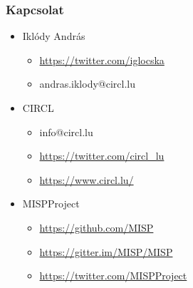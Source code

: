 \begin{frame}
  \frametitle{Kapcsolat}
  \begin{itemize}
    \item Iklódy András
    \begin{itemize}
      \item \url{https://twitter.com/iglocska}
      \item andras.iklody@circl.lu
    \end{itemize}
    \item CIRCL
    \begin{itemize}
      \item info@circl.lu
      \item \url{https://twitter.com/circl_lu}
      \item \url{https://www.circl.lu/}
    \end{itemize}
    \item MISPProject 
    \begin{itemize}
      \item \url{https://github.com/MISP}
      \item \url{https://gitter.im/MISP/MISP}
      \item \url{https://twitter.com/MISPProject}
    \end{itemize}
  \end{itemize}
\end{frame}

